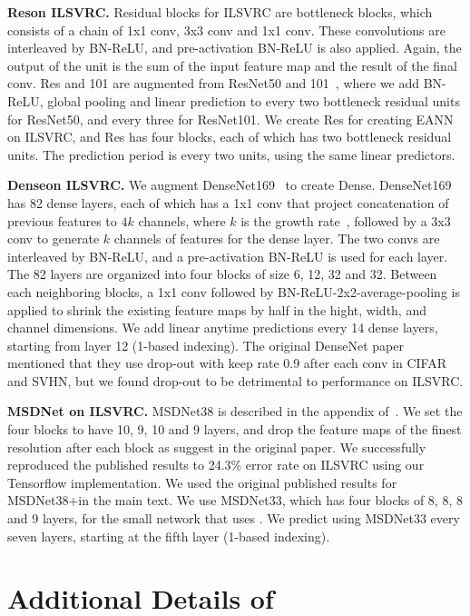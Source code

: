 \textbf{Res\anns on ILSVRC.} Residual blocks for ILSVRC are bottleneck blocks, which consists of a chain of 1x1 conv, 3x3 conv and 1x1 conv. These convolutions are interleaved by BN-ReLU, and pre-activation BN-ReLU is also applied. Again, the output of the unit is the sum of the input feature map and the result of the final conv. 
Res and 101 are augmented from ResNet50 and 101~\cite{resnet}, where we add BN-ReLU, global pooling and linear prediction to every two bottleneck residual units for ResNet50, and every three for ResNet101. 
We create Res for creating EANN on ILSVRC, and Res has four blocks, each of which has two bottleneck residual units. The prediction period is every two units, using the same linear predictors. 


\textbf{Dense\anns on ILSVRC.} We augment DenseNet169~\cite{densenet} to create Dense. 
DenseNet169 has 82 dense layers, each of which has a 1x1 conv that project concatenation of previous features to $4k$ channels, where $k$ is the growth rate~\cite{densenet}, followed by a 3x3 conv to generate $k$ channels of features for the dense layer. The two convs are interleaved by BN-ReLU, and a pre-activation BN-ReLU is used for each layer. The 82 layers are organized into four blocks of size 6, 12, 32 and 32. Between each neighboring blocks, a 1x1 conv followed by BN-ReLU-2x2-average-pooling is applied to shrink the existing feature maps by half in the hight, width, and channel dimensions. We add linear anytime predictions every 14 dense layers, starting from layer 12 (1-based indexing). The original DenseNet paper~\cite{densenet} mentioned that they use drop-out with keep rate 0.9 after each conv in CIFAR and SVHN, but we found drop-out to be detrimental to performance on ILSVRC.


\textbf{MSDNet on ILSVRC.} MSDNet38 is described in the appendix of~\cite{msdense}. We set the four blocks to have 10, 9, 10 and 9 layers, and drop the feature maps of the finest resolution after each block as suggest in the original paper. 
We successfully reproduced the published results to 24.3\% error rate on ILSVRC using our Tensorflow implementation. We used the original published results for MSDNet38+\const in the main text. We use MSDNet33, which has four blocks of 8, 8, 8 and 9 layers, for the small network that uses \adaloss. We predict using MSDNet33 every seven layers, starting at the fifth layer (1-based indexing). 



\section{Additional Details of \adaloss}

